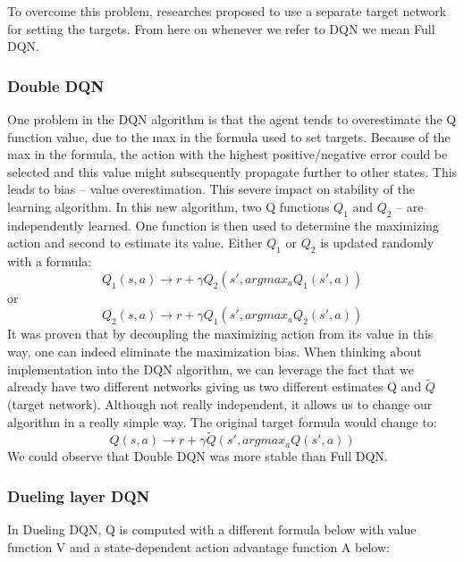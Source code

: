 To overcome this problem, researches proposed to use a separate target network for setting the targets. From here on whenever we refer to DQN we mean Full DQN.

\subsubsection{Double DQN}
One problem in the DQN algorithm is that the agent tends to overestimate the Q function value, due to the max in the formula used to set targets.
Because of the max in the formula, the action with the highest positive/negative error could be selected and this value might subsequently propagate further to other states. This leads to bias – value overestimation. This severe impact on stability of the learning algorithm.
\newline
In this new algorithm, two Q functions $Q_{1}$ and $Q_2$ – are independently learned. One function is then used to determine the maximizing action and second to estimate its value. Either $Q_1$ or $Q_2$ is updated randomly with a formula:
\begin{equation}
Q_1(s, a) \xrightarrow{} r + \gamma Q_2(s', argmax_a Q_1(s', a)) 
\end{equation}
or
\begin{equation}
Q_2(s, a) \xrightarrow{} r + \gamma Q_1(s', argmax_a Q_2(s', a)) 
\end{equation}
It was proven that by decoupling the maximizing action from its value in this way, one can indeed eliminate the maximization bias.
\newline
When thinking about implementation into the DQN algorithm, we can leverage the fact that we already have two different networks giving us two different estimates Q and $\tilde{Q}$ (target network). Although not really independent, it allows us to change our algorithm in a really simple way.
\newline
The original target formula would change to:
\begin{equation}
Q(s, a) \xrightarrow{} r + \gamma \tilde{Q}(s', argmax_a Q(s', a))
\end{equation}
We could observe that Double DQN was more stable than Full DQN.
 
\subsubsection{Dueling layer DQN}


In Dueling DQN, Q is computed with a different formula below with value function V and a state-dependent action advantage function A below:

